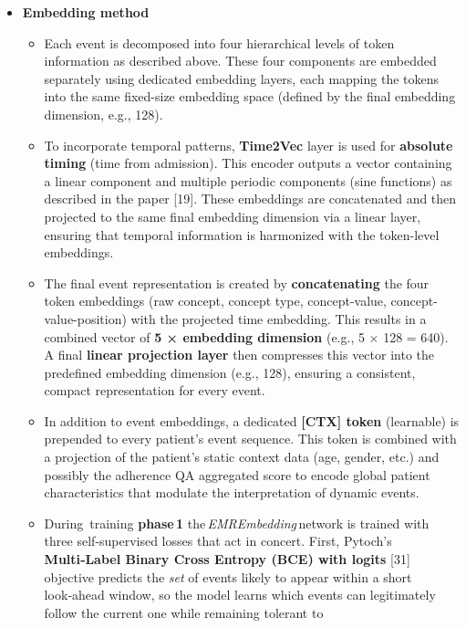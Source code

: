 \documentclass[
]{article}
\begin{document}
\begin{itemize}
\item
  \textbf{Embedding method}

  \begin{itemize}
  \item
    Each event is decomposed into four hierarchical levels of token
    information as described above. These four components are embedded
    separately using dedicated embedding layers, each mapping the tokens
    into the same fixed-size embedding space (defined by the final
    embedding dimension, e.g., 128).
  \item
    To incorporate temporal patterns, \textbf{Time2Vec} layer is used
    for \textbf{absolute timing} (time from admission). This encoder
    outputs a vector containing a linear component and multiple periodic
    components (sine functions) as described in the paper {[}19{]}.
    These embeddings are concatenated and then projected to the same
    final embedding dimension via a linear layer, ensuring that temporal
    information is harmonized with the token-level embeddings.
  \item
    The final event representation is created by \textbf{concatenating}
    the four token embeddings (raw concept, concept type, concept-value,
    concept-value-position) with the projected time embedding. This
    results in a combined vector of \textbf{5 × embedding dimension}
    (e.g., 5 × 128 = 640). A final \textbf{linear projection layer} then
    compresses this vector into the predefined embedding dimension
    (e.g., 128), ensuring a consistent, compact representation for every
    event.
  \item
    In addition to event embeddings, a dedicated \textbf{{[}CTX{]}
    token} (learnable) is prepended to every patient's event sequence.
    This token is combined with a projection of the patient's static
    context data (age, gender, etc.) and possibly the adherence QA
    aggregated score to encode global patient characteristics that
    modulate the interpretation of dynamic events.
  \item
    During \,training \textbf{phase\,1}
    the\,\emph{EMREmbedding}\,network is trained with three
    self‑supervised losses that act in concert. First, Pytoch's
    \textbf{Multi‑Label Binary Cross Entropy (BCE) with logits} {[}31{]}
    objective predicts the \emph{set} of events likely to appear within
    a short look‑ahead window, so the model learns which events can
    legitimately follow the current one while remaining tolerant to

\end{itemize}
\end{itemize}
\end{document}
